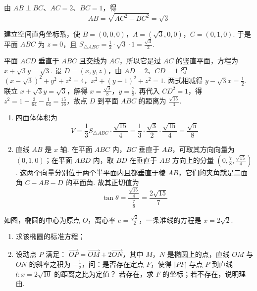 \begin{solution}
由 \(AB\perp BC\)、\(AC=2\)、\(BC=1\)，得
\[
AB=\sqrt{AC^{2}-BC^{2}}=\sqrt3
\]

建立空间直角坐标系，使 \(B=(0,0,0)\)，\(A=(\sqrt3,0,0)\)，\(C=(0,1,0)\). 于是平面 \(ABC\) 为 \(z=0\)，且
\(S_{\triangle ABC}=\frac12\cdot\sqrt3\cdot1=\frac{\sqrt3}{2}\).

平面 \(ACD\) 垂直于 \(ABC\) 且交线为 \(AC\)，所以它是过 \(AC\) 的竖直平面，方程为
\(x+\sqrt3y=\sqrt3\). 设 \(D=(x,y,z)\)，由 \(AD=2\)、\(CD=1\) 得
\((x-\sqrt3)^{2}+y^{2}+z^{2}=4\)，\(x^{2}+(y-1)^{2}+z^{2}=1\).
两式相减得 \(y-\sqrt3x=\frac12\). 联立 \(x+\sqrt3y=\sqrt3\)，解得
\(x=\frac{\sqrt3}{8}\)，\(y=\frac78\). 再代入 \(CD^{2}=1\)，得
\(z^{2}=1-\frac{3}{64}-\frac{1}{64}=\frac{15}{16}\)，故点 \(D\) 到平面 \(ABC\) 的距离为 \(\frac{\sqrt{15}}4\).

\begin{enumerate}
\item 四面体体积为
\[
V=\frac13S_{\triangle ABC}\cdot\frac{\sqrt{15}}4
=\frac13\cdot\frac{\sqrt3}{2}\cdot\frac{\sqrt{15}}4
=\frac{\sqrt5}{8}
\]
\item 直线 \(AB\) 是 \(x\) 轴. 在平面 \(ABC\) 内，\(BC\) 垂直于 \(AB\)，可取其方向向量为 \((0,1,0)\)；在平面 \(ABD\) 内，取 \(BD\) 在垂直于 \(AB\) 方向上的分量 \((0,\frac78,\frac{\sqrt{15}}4)\). 这两个向量分别位于两个半平面内且都垂直于棱 \(AB\)，它们的夹角就是二面角 \(C-AB-D\) 的平面角. 故其正切值为
\[
\tan\theta=\frac{\frac{\sqrt{15}}4}{\frac78}=\frac{2\sqrt{15}}7
\]
\end{enumerate}
\end{solution}

\begin{problem}
如图，椭圆的中心为原点 \(O\)，离心率 \( e = \frac{\sqrt{2}}{2} \)，一条准线的方程是 \( x = 2\sqrt{2} \).
\begin{enumerate}
\item 求该椭圆的标准方程；
\item 设动点 \(P\) 满足： \(\overrightarrow{OP} = \overrightarrow{OM} + 2\overrightarrow{ON}\)，其中 \(M\)，\(N\) 是椭圆上的点，直线 \(OM\) 与 \(ON\) 的斜率之积为 \(-\frac{1}{2}\)，问：是否存在定点 \(F\)，使得 \(|PF|\) 与点 \(P\) 到直线 \(l: x = 2\sqrt{10}\) 的距离之比为定值？ 若存在，求 \(F\) 的坐标；若不存在，说明理由.
\end{enumerate}
\end{problem}

